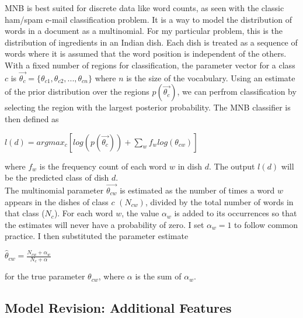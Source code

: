 \documentclass[12pt]{article}
\begin{document}
\noindent MNB is best suited for discrete data like word counts, as seen with the classic ham/spam e-mail classification problem. It is a way to model the distribution of words in a document as a multinomial\cite{Rennie}. For my particular problem, this is the distribution of ingredients in an Indian dish. Each dish is treated as a sequence of words where it is assumed that the word position is independent of the others. With a fixed number of regions for classification, the parameter vector for a class $c$ is $\vec{\theta_c} = \{\theta_{c1}, \theta_{c2}, ..., \theta_{cn} \}$ where $n$ is the size of the vocabulary. Using an estimate of the prior distribution over the regions $p(\vec{\theta_c})$, we can perfrom classification by selecting the region with the largest posterior probability. The MNB classifier is then defined as
\begin{center}
$l(d) = argmax_c [log(p(\vec{\theta_c})) + \sum_{w} f_w log(\theta_{cw})]$
\end{center}
where $f_w$ is the frequency count of each word $w$ in dish $d$.
The output $l(d)$ will be the predicted class of dish $d$. \\
 
\noindent The multinomial parameter $\vec{\theta_{cw}}$ is estimated as the number of times a word $w$ appears in the dishes of class $c$ $(N_{cw})$, divided by the total number of words in that class ($N_c$).
For each word $w$, the value $\alpha_w$ is added to its occurrences so that the estimates will never have a probability of zero. I set $\alpha_w = 1$ to follow common practice. I then substituted the parameter estimate
\begin{center}
$\hat{\theta}_{cw} = \frac{N_{cw} + \alpha_w}{N_c + \alpha}$
\end{center}
for the true parameter $\theta_{cw}$, where $\alpha$ is the sum of $\alpha_w$.

\subsection{Model Revision: Additional Features}
\end{document}
